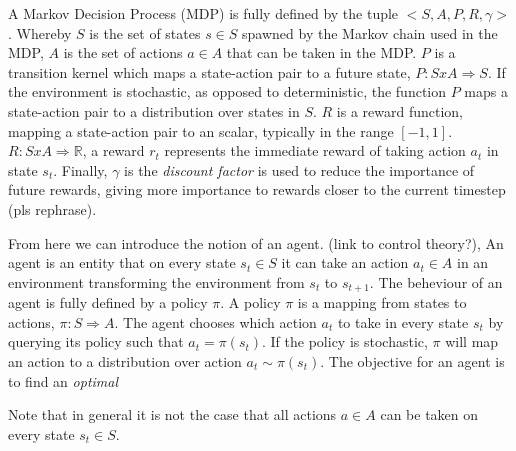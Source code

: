 \documentclass{../main.tex}{subfiles}
\begin{document}
A Markov Decision Process (MDP) is fully defined by the tuple $< S, A, P, R, \gamma>$. Whereby $S$ is the set of states $s \in S$ spawned by the Markov chain used in the MDP, $A$ is the set of actions $a \in A$ that can be taken in the MDP. $P$ is a transition kernel which maps a state-action pair to a future state, $P: S x A \Rightarrow S$. If the environment is stochastic, as opposed to deterministic, the function $P$ maps a state-action pair to a distribution over states in $S$. $R$ is a reward function, mapping a state-action pair to an scalar, typically in the range $[-1,1]$. $R: S x A \Rightarrow \mathbb{R}$, a reward $r_t$ represents the immediate reward of taking action $a_t$ in state $s_t$. Finally, $\gamma$ is the \textit{discount factor} is used to reduce the importance of future rewards, giving more importance to rewards closer to the current timestep (pls rephrase).

From here we can introduce the notion of an agent. (link to control theory?), An agent is an entity that on every state $s_t \in S$ it can take an action $a_t \in A$ in an environment transforming the environment from $s_t$ to $s_{t+1}$. The beheviour of an agent is fully defined by a policy $\pi$. A policy $\pi$ is a mapping from states to actions, $\pi: S \Rightarrow A$. The agent chooses which action $a_t$ to take in every state $s_t$ by querying its policy such that $a_t = \pi(s_t)$. If the policy is stochastic, $\pi$ will map an action to a distribution over action $a_t \sim \pi(s_t)$. The objective for an agent is to find an \textit{optimal}


Note that in general it is not the case that all actions $a \in A$ can be taken on every state $s_t \in S$.
\end{document}
